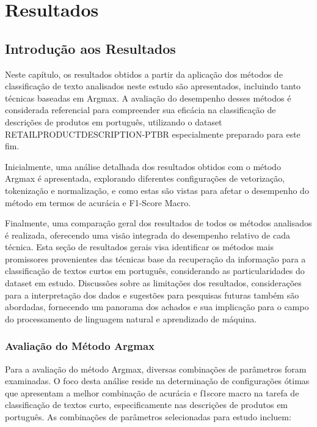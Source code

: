 \chapter{Resultados}

\section{Introdução aos Resultados}

Neste capítulo, os resultados obtidos a partir da aplicação dos métodos de classificação de texto analisados neste estudo são apresentados, incluindo tanto técnicas baseadas em Argmax. A avaliação do desempenho desses métodos é considerada referencial para compreender sua eficácia na classificação de descrições de produtos em português, utilizando o dataset RETAILPRODUCTDESCRIPTION-PTBR especialmente preparado para este fim.

Inicialmente, uma análise detalhada dos resultados obtidos com o método Argmax é apresentada, explorando diferentes configurações de vetorização, tokenização e normalização, e como estas são vistas para afetar o desempenho do método em termos de acurácia e F1-Score Macro.

Finalmente, uma comparação geral dos resultados de todos os métodos analisados é realizada, oferecendo uma visão integrada do desempenho relativo de cada técnica. Esta seção de resultados gerais visa identificar os métodos mais promissores provenientes das técnicas base da recuperação da informação para a classificação de textos curtos em português, considerando as particularidades do dataset em estudo. Discussões sobre as limitações dos resultados, considerações para a interpretação dos dados e sugestões para pesquisas futuras também são abordadas, fornecendo um panorama dos achados e sua implicação para o campo do processamento de linguagem natural e aprendizado de máquina.

\subsection{Avaliação do Método Argmax}

Para a avaliação do método Argmax, diversas combinações de parâmetros foram examinadas. O foco desta análise reside na determinação de configurações ótimas que apresentam a melhor combinação de acurácia e f1score macro na tarefa de classificação de textos curto, especificamente nas descrições de produtos em português. As combinações de parâmetros selecionadas para estudo incluem:

